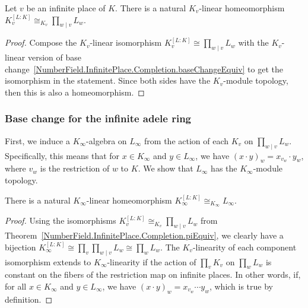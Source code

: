 \begin{theorem}
  \label{NumberField.InfinitePlace.Completion.piEquiv}
  \leanok
  Let $v$ be an infinite place of $K$. There is a natural $K_v$-linear homeomorphism
  $K_v^{[L:K]} \cong_{K_v} \prod_{w\mid v}L_w$.
\end{theorem}
\begin{proof}
  Compose the $K_v$-linear isomorphism $K_v^{[L:K]} \cong \prod_{w\mid v}L_w$ with the $K_v$-linear
  version of base change~\ref{NumberField.InfinitePlace.Completion.baseChangeEquiv} to get the
  isomorphism in the statement.
  Since both sides have the $K_v$-module topology, then this is also a homeomorphism.
\end{proof}

\subsubsection{Base change for the infinite adele ring}

First, we induce a $K_{\infty}$-algebra on $L_{\infty}$ from the action of each $K_v$ on
$\prod_{w\mid v}L_w$.
Specifically, this means that for $x \in K_{\infty}$ and $y \in L_{\infty}$, we have
$(x \cdot y)_w = x_{v_w} \cdot y_w$, where $v_w$ is the restriction of $w$ to $K$.
We show that $L_{\infty}$ has the $K_{\infty}$-module topology.

\begin{theorem}
  \label{NumberField.InfiniteAdeleRing.piEquiv}
  \leanok
  There is a natural $K_{\infty}$-linear homeomorphism
  $K_{\infty}^{[L:K]} \cong_{K_{\infty}} L_{\infty}$.
\end{theorem}
\begin{proof}
  Using the isomorphisms $K_v^{[L:K]} \cong_{K_v} \prod_{w\mid v}L_w$ from
  Theorem~\ref{NumberField.InfinitePlace.Completion.piEquiv}, we clearly have a bijection
  $K_{\infty}^{[L:K]} \cong \prod_v\prod_{w \mid v} L_w \cong \prod_w L_w$.
  The $K_v$-linearity of each component isomorphism extends to $K_{\infty}$-linearity if the
  action of $\prod_v K_v$ on $\prod_w L_w$ is constant on the fibers of the restriction map on
  infinite places.
  In other words, if, for all $x \in K_{\infty}$ and $y \in L_{\infty}$, we have
  $(x \cdot y)_w = x_{v_w} \cdots y_w$, which is true by definition.
\end{proof}

